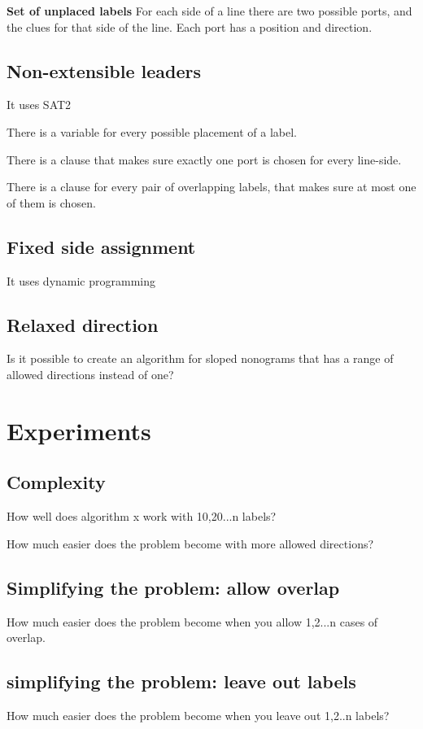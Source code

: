 \documentclass[a4paper]{article}
\begin{document}
\textbf{Set of unplaced labels} For each side of a line there are two possible ports, and the clues for that side of the line. Each port has a position and direction. 

\subsection{Non-extensible leaders}
It uses SAT2

There is a variable for every possible placement of a label.

There is a clause that makes sure exactly one port is chosen for every line-side.

There is a clause for every pair of overlapping labels, that makes sure at most one of them is chosen.

\subsection{Fixed side assignment}
It uses dynamic programming

\subsection{Relaxed direction}
Is it possible to create an algorithm for sloped nonograms that has a range of allowed directions instead of one?

\section{Experiments}
\subsection{Complexity}
How well does algorithm x work with 10,20...n labels?

How much easier does the problem become with more allowed directions?

\subsection{Simplifying the problem: allow overlap}
How much easier does the problem become when you allow 1,2...n cases of overlap.

\subsection{simplifying the problem: leave out labels}
How much easier does the problem become when you leave out 1,2..n labels?

{}

\end{document}
